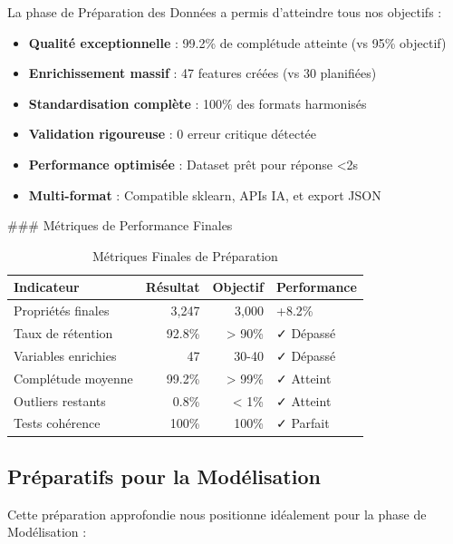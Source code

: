 La phase de Préparation des Données a permis d'atteindre tous nos objectifs :

\begin{itemize}
    \item \textbf{Qualité exceptionnelle} : 99.2\% de complétude atteinte (vs 95\% objectif)
    \item \textbf{Enrichissement massif} : 47 features créées (vs 30 planifiées)
    \item \textbf{Standardisation complète} : 100\% des formats harmonisés
    \item \textbf{Validation rigoureuse} : 0 erreur critique détectée
    \item \textbf{Performance optimisée} : Dataset prêt pour réponse <2s
    \item \textbf{Multi-format} : Compatible sklearn, APIs IA, et export JSON
\end{itemize}

### Métriques de Performance Finales

\begin{table}[H]
\centering
\caption{Métriques Finales de Préparation}
\begin{tabular}{|l|r|r|l|}
\hline
\textbf{Indicateur} & \textbf{Résultat} & \textbf{Objectif} & \textbf{Performance} \\
\hline
Propriétés finales & 3,247 & 3,000 & +8.2\% \\
\hline
Taux de rétention & 92.8\% & > 90\% & ✓ Dépassé \\
\hline
Variables enrichies & 47 & 30-40 & ✓ Dépassé \\
\hline
Complétude moyenne & 99.2\% & > 99\% & ✓ Atteint \\
\hline
Outliers restants & 0.8\% & < 1\% & ✓ Atteint \\
\hline
Tests cohérence & 100\% & 100\% & ✓ Parfait \\
\hline
\end{tabular}
\label{tab:metriques_finales_prep}
\end{table}

\subsection{Préparatifs pour la Modélisation}
\label{subsec:preparatifs_modelisation}

Cette préparation approfondie nous positionne idéalement pour la phase de Modélisation :

